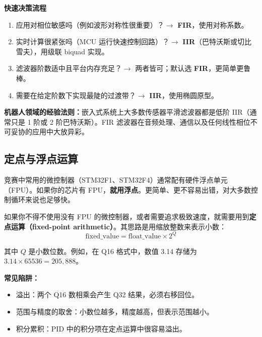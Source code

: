 \vspace{0.5em}
\begin{mdframed}[linewidth=1pt, innertopmargin=10pt, innerbottommargin=10pt]
\textbf{快速决策流程}

\vspace{0.3em}
\begin{enumerate}[nosep]
    \item 应用对相位敏感吗（例如波形对称性很重要）？$\rightarrow$ \textbf{FIR}，使用对称系数。
    \item 实时计算很紧张吗（MCU 运行快速控制回路）？$\rightarrow$ \textbf{IIR}（巴特沃斯或切比雪夫），用级联 biquad 实现。
    \item 滤波器阶数适中且平台内存充足？$\rightarrow$ 两者皆可；默认选 \textbf{FIR}，更简单更鲁棒。
    \item 需要在给定阶数下实现最陡的过渡带？$\rightarrow$ \textbf{IIR}，使用椭圆原型。
\end{enumerate}

\textbf{机器人领域的经验法则：}嵌入式系统上大多数传感器平滑滤波器都是低阶 IIR（通常只是 1 阶或 2 阶巴特沃斯）。FIR 滤波器在音频处理、通信以及任何线性相位不可妥协的应用中大放异彩。
\end{mdframed}

\subsection{定点与浮点运算}

竞赛中常用的微控制器（STM32F1、STM32F4）通常配有硬件浮点单元（FPU）。如果你的芯片有 FPU，\textbf{就用浮点}。更简单、更不容易出错，对大多数控制循环来说也足够快。

如果你不得不使用没有 FPU 的微控制器，或者需要追求极致速度，就需要用到\textbf{定点运算（fixed-point arithmetic）}。其思路是用缩放整数来表示小数：
\begin{equation}
\text{fixed\_value} = \text{float\_value} \times 2^Q
\end{equation}

其中 $Q$ 是小数位数。例如，在 Q16 格式中，数值 3.14 存储为 $3.14 \times 65536 = 205{,}888$。

\textbf{常见陷阱：}
\begin{itemize}
    \item 溢出：两个 Q16 数相乘会产生 Q32 结果，必须右移回位。
    \item 范围与精度的取舍：小数位越多，精度越高，但表示范围越小。
    \item 积分累积：PID 中的积分项在定点运算中很容易溢出。
\end{itemize}

